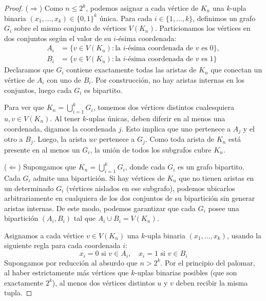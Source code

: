 \begin{proof}
    (\( \Longrightarrow \)) Como \(n \leq 2^k\), podemos asignar a cada vértice de \(K_n\) una \(k\)-upla binaria \((x_1, \ldots, x_k) \in {\{0,1\}}^k\) única.
    Para cada \( i \in \{1, \ldots, k\} \), definimos un grafo \(G_i\) sobre el mismo conjunto de vértices \(V(K_n)\). Particionamos los vértices en dos conjuntos según el valor de su \(i\)-ésima coordenada:
    \begin{align*}
        A_i & = \{ v \in V(K_n) : \text{la } i\text{-ésima coordenada de } v \text{ es } 0 \}, \\
        B_i & = \{ v \in V(K_n) : \text{la } i\text{-ésima coordenada de } v \text{ es } 1 \}
    \end{align*}
    Declaramos que \(G_i\) contiene exactamente todas las aristas de \(K_n\) que conectan un vértice de \(A_i\) con uno de \(B_i\). Por construcción, no hay aristas internas en los conjuntos, luego cada \(G_i\) es bipartito.

    Para ver que \(K_n = \bigcup_{i=1}^k G_i\), tomemos dos vértices distintos cualesquiera \(u, v \in V(K_n)\). Al tener \(k\)-uplas únicas, deben diferir en al menos una coordenada, digamos la coordenada \(j\). Esto implica que uno pertenece a \(A_j\) y el otro a \(B_j\). Luego, la arista \(uv\) pertenece a \(G_j\). Como toda arista de \(K_n\) está presente en al menos un \(G_i\), la unión de todos los subgrafos cubre \(K_n\).

    \vspace{0.3cm}

    (\( \Longleftarrow \)) Supongamos que \(K_n = \bigcup_{i=1}^k G_i\), donde cada \(G_i\) es un grafo bipartito.
    Cada \(G_i\) admite una bipartición. Si hay vértices de \(K_n\) que no tienen aristas en un determinado \(G_i\) (vértices aislados en ese subgrafo), podemos ubicarlos arbitrariamente en cualquiera de los dos conjuntos de su bipartición sin generar aristas internas. De este modo, podemos garantizar que cada \(G_i\) posee una bipartición \((A_i, B_i)\) tal que \(A_i \cup B_i = V(K_n)\).

    Asignamos a cada vértice \(v \in V(K_n)\) una \(k\)-upla binaria \((x_1, \ldots, x_k)\), usando la siguiente regla para cada coordenada \(i\):
    \[
        x_i = 0 \text{ si } v \in A_i, \quad x_i = 1 \text{ si } v \in B_i
    \]
    Supongamos por reducción al absurdo que \(n > 2^k\). Por el principio del palomar, al haber estrictamente más vértices que \(k\)-uplas binarias posibles (que son exactamente \(2^k\)), al menos dos vértices distintos \(u\) y \(v\) deben recibir la misma tupla.


\end{proof}
